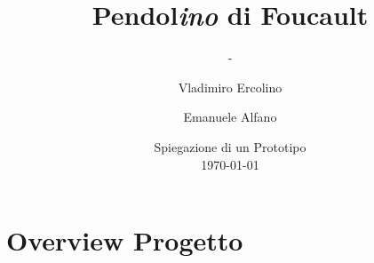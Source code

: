 \documentclass[
	10pt, %
]{beamer}
\title[Pendol\textit{ino} di Foucault]{Pendol\textit{ino} di Foucault} %
\subtitle{-} %
\author[Vladimiro Ercolino \and Emanuele Alfano]{Vladimiro Ercolino \and Emanuele Alfano} %
\institute[MR]{Maker of Rome} %
\date[\today]{Spiegazione di un Prototipo \\ \today} %
\begin{document}

\begin{frame}
	\titlepage %
\end{frame}



\AtBeginSection[]{
	\begin{frame}
		\tableofcontents[currentsection] %
	\end{frame}
}


\section{Overview Progetto} %
\end{document}
